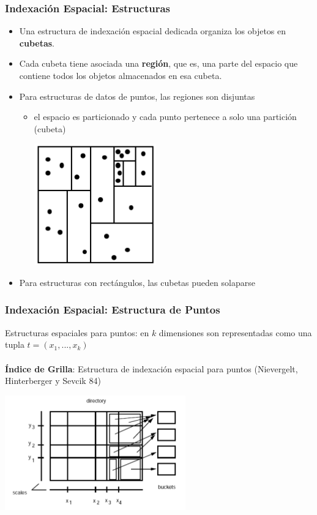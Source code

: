 \documentclass[a4paper,12pt,oneside]{report}
\begin{document}
\subsubsection*{Indexaci\'on Espacial: Estructuras}
\begin{itemize}
\item Una estructura de indexaci\'on espacial dedicada organiza los objetos en \textbf{cubetas}.
\item Cada cubeta tiene asociada una \textbf{regi\'on}, que es, una parte del espacio que contiene todos los objetos almacenados en esa cubeta.
\item Para estructuras de datos de puntos, las regiones son disjuntas
\begin{itemize}
\item el espacio es particionado y cada punto pertenece a solo una partici\'on (cubeta)
\begin{center}\includegraphics[scale=0.3]{Imagenes/8.png}
\end{center}\end{itemize}
\item Para estructuras con rect\'angulos, las cubetas pueden solaparse
\end{itemize}


\subsubsection*{Indexaci\'on Espacial: Estructura de Puntos}
Estructuras espaciales para puntos: en $k$ dimensiones son representadas como una tupla $t = (x_1,...,x_k)$\\
\ \\
\textbf{\'Indice de Grilla}: Estructura de indexaci\'on espacial para puntos (Nievergelt, Hinterberger y Sevcik 84)
\begin{center}
\includegraphics[scale=0.4]{Imagenes/9.png}
\end{center}
\end{document}
